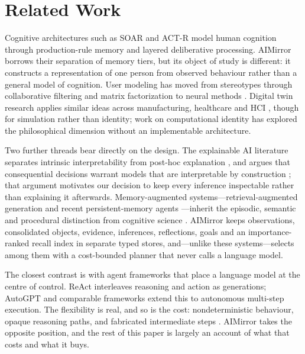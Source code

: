\documentclass[conference]{IEEEtran}
\begin{document}
\section{Related Work}
\label{sec:related}

Cognitive architectures such as SOAR \cite{soar1999} and ACT-R \cite{anderson2004} model human cognition through production-rule memory and layered deliberative processing. AIMirror borrows their separation of memory tiers, but its object of study is different: it constructs a representation of one person from observed behaviour rather than a general model of cognition. User modeling has moved from stereotypes \cite{kobsa2001} through collaborative filtering \cite{resnick1997} and matrix factorization \cite{koren2009} to neural methods \cite{he2017}. Digital twin research applies similar ideas across manufacturing, healthcare and HCI \cite{tao2019}, though for simulation rather than identity; work on computational identity \cite{floridi2011} has explored the philosophical dimension without an implementable architecture.

Two further threads bear directly on the design. The explainable AI literature separates intrinsic interpretability from post-hoc explanation \cite{lipton2016}, and argues that consequential decisions warrant models that are interpretable by construction \cite{rudin2019}; that argument motivates our decision to keep every inference inspectable rather than explaining it afterwards. Memory-augmented systems---retrieval-augmented generation \cite{lewis2020} and recent persistent-memory agents \cite{park2023}---inherit the episodic, semantic and procedural distinction from cognitive science \cite{tulving1972}. AIMirror keeps observations, consolidated objects, evidence, inferences, reflections, goals and an importance-ranked recall index in separate typed stores, and---unlike these systems---selects among them with a cost-bounded planner that never calls a language model.

The closest contrast is with agent frameworks that place a language model at the centre of control. ReAct \cite{yao2023} interleaves reasoning and action as generations; AutoGPT \cite{autogpt2023} and comparable frameworks extend this to autonomous multi-step execution. The flexibility is real, and so is the cost: nondeterministic behaviour, opaque reasoning paths, and fabricated intermediate steps \cite{ji2023}. AIMirror takes the opposite position, and the rest of this paper is largely an account of what that costs and what it buys.
\end{document}
